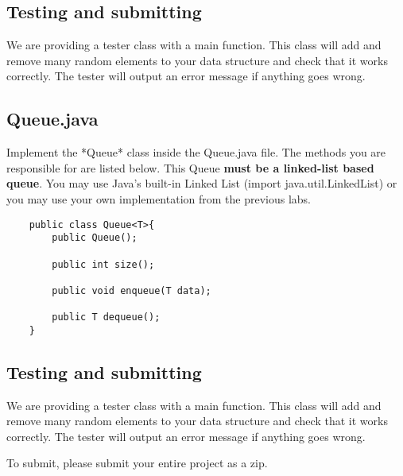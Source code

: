 \documentclass[paper=a4, fontsize=11pt, parskip=full]{scrartcl} %
\numberwithin{equation}{section} %
\numberwithin{figure}{section} %
\numberwithin{table}{section} %
\begin{document}
\subsection{Testing and submitting}

We are providing a tester class with a main function. This class will add and remove many random elements to your data structure and check that it works correctly. The tester will output an error message if anything goes wrong.



\subsection{Queue.java}

Implement the *Queue* class inside the Queue.java file. The methods you are responsible for are listed below. This Queue \textbf{must be a linked-list based queue}. You may use Java's built-in Linked List (import java.util.LinkedList) or you may use your own implementation from the previous labs.

\begin{lstlisting}
	public class Queue<T>{
		public Queue();

		public int size();

		public void enqueue(T data);

		public T dequeue();
	}
\end{lstlisting}

\subsection{Testing and submitting}

We are providing a tester class with a main function. This class will add and remove many random elements to your data structure and check that it works correctly. The tester will output an error message if anything goes wrong.

To submit, please submit your entire project as a zip.




\end{document}
